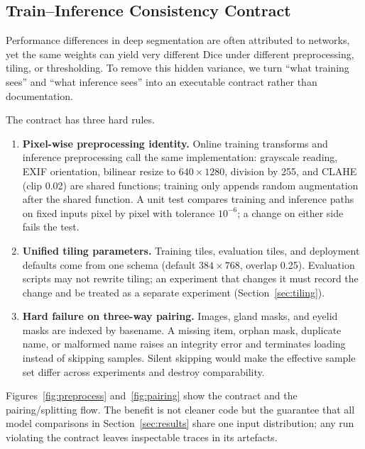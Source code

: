 \subsection{Train--Inference Consistency Contract}\label{sec:contract}

Performance differences in deep segmentation are often attributed to networks, yet the same weights can yield very different Dice under different preprocessing, tiling, or thresholding. To remove this hidden variance, we turn ``what training sees'' and ``what inference sees'' into an executable contract rather than documentation.

The contract has three hard rules.

\begin{enumerate}[label=\textbf{C\arabic*.}]
\item \textbf{Pixel-wise preprocessing identity.} Online training transforms and inference preprocessing call the same implementation: grayscale reading, EXIF orientation, bilinear resize to $640\times1280$, division by 255, and CLAHE (clip 0.02) are shared functions; training only appends random augmentation after the shared function. A unit test compares training and inference paths on fixed inputs pixel by pixel with tolerance $10^{-6}$; a change on either side fails the test.
\item \textbf{Unified tiling parameters.} Training tiles, evaluation tiles, and deployment defaults come from one schema (default $384\times768$, overlap 0.25). Evaluation scripts may not rewrite tiling; an experiment that changes it must record the change and be treated as a separate experiment (Section~\ref{sec:tiling}).
\item \textbf{Hard failure on three-way pairing.} Images, gland masks, and eyelid masks are indexed by basename. A missing item, orphan mask, duplicate name, or malformed name raises an integrity error and terminates loading instead of skipping samples. Silent skipping would make the effective sample set differ across experiments and destroy comparability.
\end{enumerate}

Figures~\ref{fig:preprocess} and~\ref{fig:pairing} show the contract and the pairing/splitting flow. The benefit is not cleaner code but the guarantee that all model comparisons in Section~\ref{sec:results} share one input distribution; any run violating the contract leaves inspectable traces in its artefacts.



